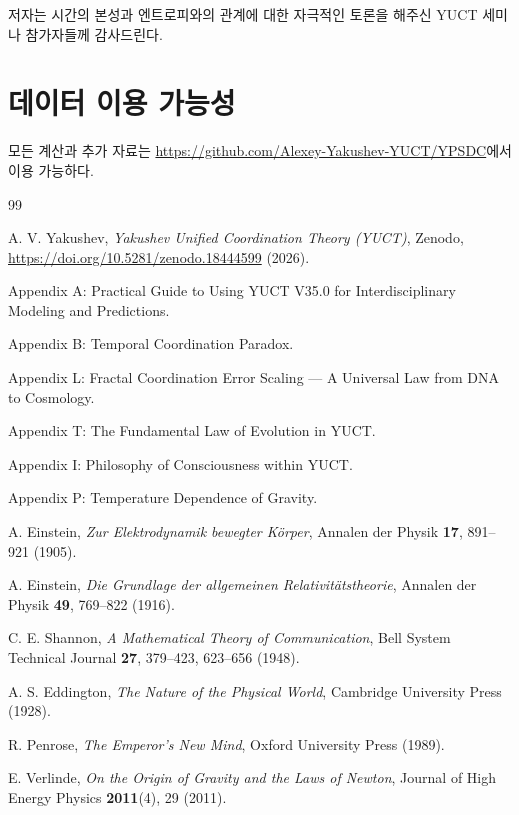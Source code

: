 \documentclass[12pt,a4paper]{article}
\begin{document}
	저자는 시간의 본성과 엔트로피와의 관계에 대한 자극적인 토론을 해주신 YUCT 세미나 참가자들께 감사드린다.
	
	\section*{데이터 이용 가능성}
	
	모든 계산과 추가 자료는 \url{https://github.com/Alexey-Yakushev-YUCT/YPSDC}에서 이용 가능하다.
	
	\begin{thebibliography}{99}
		
		A. V. Yakushev, \emph{Yakushev Unified Coordination Theory (YUCT)}, Zenodo, \url{https://doi.org/10.5281/zenodo.18444599} (2026).
		
		Appendix A: Practical Guide to Using YUCT V35.0 for Interdisciplinary Modeling and Predictions.
		
		Appendix B: Temporal Coordination Paradox.
		
		Appendix L: Fractal Coordination Error Scaling — A Universal Law from DNA to Cosmology.
		
		Appendix T: The Fundamental Law of Evolution in YUCT.
		
		Appendix I: Philosophy of Consciousness within YUCT.
		
		Appendix P: Temperature Dependence of Gravity.
		
		A. Einstein, \emph{Zur Elektrodynamik bewegter Körper}, Annalen der Physik \textbf{17}, 891–921 (1905).
		
		A. Einstein, \emph{Die Grundlage der allgemeinen Relativitätstheorie}, Annalen der Physik \textbf{49}, 769–822 (1916).
		
		C. E. Shannon, \emph{A Mathematical Theory of Communication}, Bell System Technical Journal \textbf{27}, 379–423, 623–656 (1948).
		
		A. S. Eddington, \emph{The Nature of the Physical World}, Cambridge University Press (1928).
		
		R. Penrose, \emph{The Emperor's New Mind}, Oxford University Press (1989).
		
		E. Verlinde, \emph{On the Origin of Gravity and the Laws of Newton}, Journal of High Energy Physics \textbf{2011}(4), 29 (2011).
		

\end{thebibliography}
\end{document}
